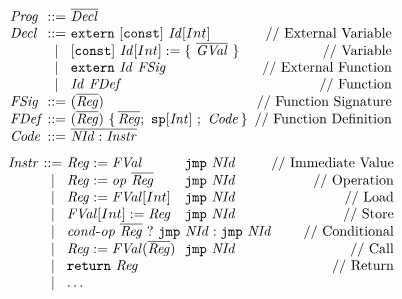 \begin{figure}[t]
\[
\begin{array}{@{}l@{~}c@{~}l@{~~}lr@{}}
\rtlProg &::=& \overline{\rtlDecl}
\\
\rtlDecl &::=& 
\multicolumn{2}{@{}l@{}}{\rtlextern~\consthide{[\rtlconst]~}\typhide{\typhide{\mathit{Typ}~}}\rtlId[Int]} &\text{// External Variable} \\
&|&\multicolumn{2}{@{}l@{}}{\consthide{[\rtlconst]~}\typhide{\mathit{Typ}~}\rtlId[Int] := \{~\overline{\rtlGVal}~\}} & \text{// Variable}\\
&|&\multicolumn{2}{@{}l@{}}{\rtlextern~\typhide{\mathit{Typ}~}\rtlId~\rtlFSig} & \text{// External Function}\\
&|&\multicolumn{2}{@{}l@{}}{\typhide{\mathit{Typ}~}\rtlId~\rtlFunc} & \text{// Function}
\\
\rtlFSig &::=& 
\multicolumn{2}{@{}l@{}}{(\overline{\typhide{\mathit{Typ}~}\rtlReg})}
&\text{// Function Signature}
\\
\rtlFunc &::=& 
\multicolumn{2}{@{}l@{}}{(\overline{\typhide{\mathit{Typ}~}\rtlReg})~
\setof{\overline{\typhide{\mathit{Typ}~}\rtlReg};~\rtlsp[\rtlInt]~;~\rtlCode}}
&\text{// Function Definition}
\\
\typhide{\mathit{Typ} &::=& \mathtt{int}~|~\mathtt{float}~|~\ldots\\}
\rtlCode &::=& \overline{\rtlNId:\rtlInstr}\\
\end{array}
\]
\vspace{-2ex}
\[
\begin{array}{@{}l@{~}c@{~}l@{~~}l@{}r@{}}
\rtlInstr &::=& \rtlReg := \rtlFVal&\rtljmp~\rtlNId&\text{// Immediate Value}
\\&|&\rtlReg := \rtlop~\overline{\rtlReg}&\rtljmp~\rtlNId&\text{// Operation}
\\&|&\rtlReg :=\rtlFVal[Int]&\rtljmp~\rtlNId&\text{// Load}
\\&|&\rtlFVal[Int] :=\rtlReg&\rtljmp~\rtlNId&\text{// Store}
\\&|&\multicolumn{2}{@{}l@{}}{\rtlcondop~\overline{\rtlReg}~?~\rtljmp~\rtlNId:\rtljmp~\rtlNId}&\text{// Conditional}
\\&|& \rtlReg := \rtlFVal(\overline{\rtlReg})&\rtljmp~\rtlNId&\text{// Call}
\\&|&\multicolumn{2}{@{}l@{}}{\rtlreturn~\rtlReg} &\text{// Return}
\\&|&\ldots\\
\end{array}
\]
\vspace{-1ex}

\end{figure}
